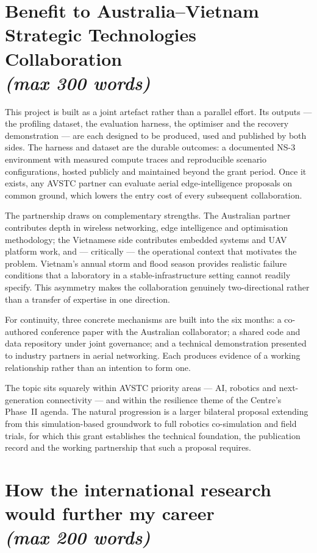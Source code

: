 \documentclass[11pt,a4paper]{article}
\begin{document}
\section{Benefit to Australia--Vietnam Strategic Technologies Collaboration \\ \normalsize\normalcolor\mdseries\itshape (max 300 words)}

This project is built as a joint artefact rather than a parallel effort. Its outputs --- the profiling dataset, the evaluation harness, the optimiser and the recovery demonstration --- are each designed to be produced, used and published by both sides. The harness and dataset are the durable outcomes: a documented NS-3 environment with measured compute traces and reproducible scenario configurations, hosted publicly and maintained beyond the grant period. Once it exists, any AVSTC partner can evaluate aerial edge-intelligence proposals on common ground, which lowers the entry cost of every subsequent collaboration.

The partnership draws on complementary strengths. The Australian partner contributes depth in wireless networking, edge intelligence and optimisation methodology; the Vietnamese side contributes embedded systems and UAV platform work, and --- critically --- the operational context that motivates the problem. Vietnam's annual storm and flood season provides realistic failure conditions that a laboratory in a stable-infrastructure setting cannot readily specify. This asymmetry makes the collaboration genuinely two-directional rather than a transfer of expertise in one direction.

For continuity, three concrete mechanisms are built into the six months: a co-authored conference paper with the Australian collaborator; a shared code and data repository under joint governance; and a technical demonstration presented to industry partners in aerial networking. Each produces evidence of a working relationship rather than an intention to form one.

The topic sits squarely within AVSTC priority areas --- AI, robotics and next-generation connectivity --- and within the resilience theme of the Centre's Phase~II agenda. The natural progression is a larger bilateral proposal extending from this simulation-based groundwork to full robotics co-simulation and field trials, for which this grant establishes the technical foundation, the publication record and the working partnership that such a proposal requires.

\section{How the international research would further my career \\ \normalsize\normalcolor\mdseries\itshape (max 200 words)}
\end{document}
